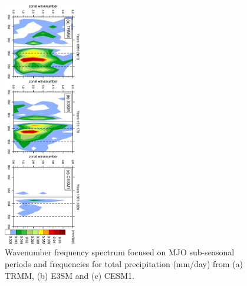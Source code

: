 \documentclass[draft,ms]{AGUTeX}
\begin{document}
\begin{article}
\begin{figure}[t]
  \begin{center}
    \noindent\includegraphics[width=0.3\textwidth,angle=90.]{./figs/f_mjo_spectra_PRECT_djf.pdf}
  \end{center}
  \caption{Wavenumber frequency spectrum focused on MJO sub-seasonal periods and frequencies for total precipitation (mm/day) from (a) TRMM, (b) E3SM and (c) CESM1.} 
\label{f_mjo_spectra_PRECT_djf}
\end{figure}


\end{article}
\end{document}
